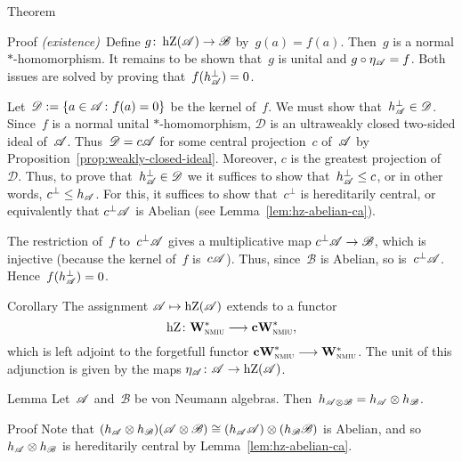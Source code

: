 \documentclass[main]{subfiles}
\begin{document}
\begin{parsec}
\begin{point}{Theorem}
\begin{point}{Proof}
\emph{(existence)}\ 
Define $g\colon \operatorname{hZ}(\mathscr{A})\to \mathscr{B}$
by~$g(a)=f(a)$.  Then~$g$ is a normal $*$-homomorphism.
It remains to be shown that~$g$ is unital and $g\circ \eta_{\mathscr{A}} = f$.
Both issues are solved by proving that~$f(h_{\mathscr{A}}^\perp)=0$.

Let~$\mathscr{D}:=\{a\in \mathscr{A}\colon f(a)=0\}$
be the kernel of~$f$.
We must show that~$h_{\mathscr{A}}^\perp \in \mathscr{D}$.
Since~$f$ is a normal unital $*$-homomorphism,
$\mathscr{D}$ is an ultraweakly closed two-sided ideal of~$\mathscr{A}$.
Thus~$\mathscr{D} = c\mathscr{A}$
for some central projection~$c$ of~$\mathscr{A}$
by Proposition~\ref{prop:weakly-closed-ideal}.
Moreover, $c$ is the greatest projection of~$\mathscr{D}$.
Thus, to prove that~$h_{\mathscr{A}}^\perp \in\mathscr{D}$
we it suffices to show that~$h_{\mathscr{A}}^\perp \leq c$,
or in other words, $c^\perp \leq h_{\mathscr{A}}$.
For this, it suffices to show that~$c^\perp$
is hereditarily central,
or equivalently that $c^\perp\mathscr{A}$
is Abelian (see Lemma~\ref{lem:hz-abelian-ca}).

The restriction of~$f$ to~$c^\perp\mathscr{A}$
gives a multiplicative map $c^\perp\mathscr{A} \to\mathscr{B}$,
which is injective (because the kernel of~$f$ is~$c\mathscr{A}$).
Thus, since~$\mathscr{B}$ is Abelian, so is~$c^\perp \mathscr{A}$.
Hence~$f(h_{\mathscr{A}}^\perp)=0$.
\end{point}
\end{point}
\begin{point}{Corollary}%
The assignment $\mathscr{A}\mapsto \operatorname{hZ}(\mathscr{A})$
extends to 
a functor 
\begin{equation*}
\operatorname{hZ}\colon \mathbf{W}^*_{\text{\textsc{nmiu}}}\longrightarrow \mathbf{cW}^*_{\text{\textsc{nmiu}}},
\end{equation*}
which is left adjoint
to the forgetfull functor $\mathbf{cW}^*_{\text{\textsc{nmiu}}}\longrightarrow \mathbf{W}^*_{\text{\textsc{nmiu}}}$.
The unit of this adjunction
is given by the maps $\eta_{\mathscr{A}}
\colon \mathscr{A}\to\operatorname{hZ}(\mathscr{A})$.
\end{point}
\begin{point}{Lemma}%
Let~$\mathscr{A}$ and~$\mathscr{B}$
be von Neumann algebras.
Then~$h_{\mathscr{A}\otimes\mathscr{B}}=
h_{\mathscr{A}}\otimes h_\mathscr{B}$.
\begin{point}{Proof}%
Note that $(h_{\mathscr{A}} \otimes h_\mathscr{B})(
\mathscr{A}\otimes\mathscr{B})
\cong (h_{\mathscr{A}}\mathscr{A})\otimes(h_\mathscr{B}\mathscr{B})$
is Abelian,
and so $h_{\mathscr{A}}\otimes h_\mathscr{B}$
is hereditarily central
by Lemma~\ref{lem:hz-abelian-ca}.


\end{point}
\end{point}
\end{parsec}
\end{document}

